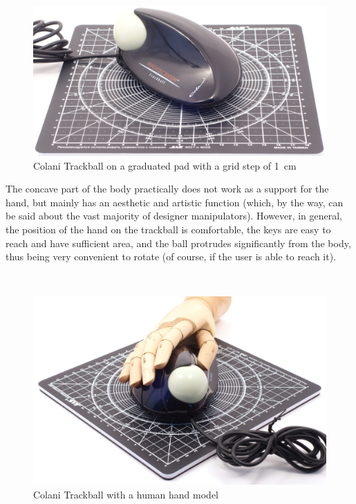 \documentclass[11pt, a4paper]{article}
\begin{document}
\begin{figure}[h]
    \centering
    \includegraphics[scale=0.52]{1993_colani_trackball/size_30.jpg}
    \caption{Colani Trackball on a graduated pad with a grid step of 1~cm}
    \label{fig:ColaniSize}
\end{figure}

The concave part of the body practically does not work as a support for the hand, but mainly has an aesthetic and artistic function (which, by the way, can be said about the vast majority of designer manipulators). However, in general, the position of the hand on the trackball is comfortable, the keys are easy to reach and have sufficient area, and the ball protrudes significantly from the body, thus being very convenient to rotate (of course, if the user is able to reach it).

~

\begin{figure}[h]
    \centering
    \includegraphics[scale=0.15]{1993_colani_trackball/hand_60.jpg}
    \caption{Colani Trackball with a human hand model}
    \label{fig:ColaniHand}
\end{figure}
\end{document}
